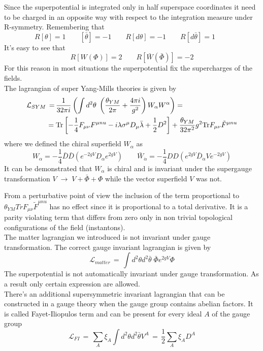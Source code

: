 \begin{appendices}
Since the superpotential is integrated only in half superspace coordinates it need to be charged in an opposite way with respect to the integration measure under R-symmetry.
Remembering  that
\begin{equation}
R[\theta] = 1 \qquad [\bar{\theta}] = - 1 \qquad R[d\theta] = -1 \qquad R [d \bar{\theta}] = 1 \qquad
\end{equation}
It's easy to see that 
\begin{equation}
R[W(\Phi)] = 2 \qquad R[\bar{W}(\bar{\Phi})] = -2
\end{equation}
For this reason in most situations the superpotential fix the supercharges of the fields.
\\
The lagrangian of super Yang-Mills theories is given by
\begin{align}
\mathcal{L}_{SYM} \, = \, & \frac{1}{32 \pi i  } \left( \int d^2 \theta \; \left( \frac{\theta_{YM}}{2 \pi}   + \frac{4 \pi i}{g^2} \right) W_{\alpha} W^{\alpha} \right) 
= 
\\
= \; & \hbox{Tr} \left[ -\frac{1}{4} F_{ \mu \nu} F^{\mu nu } - i \lambda \sigma^{\mu} D_{\mu} \bar{\lambda}  + \frac{1}{2} D^2 \right] + \frac{\theta_{YM}}{32 \pi^2 }g^2 \hbox{Tr} F_{ \mu \nu} \tilde{F}^{\mu nu } 
\end{align}
where we defined the chiral superfield $W_{\alpha}$ as
\begin{equation}
 W_{\alpha} = - \frac{1}{4} \bar{D} \bar{D}\left(e^{-2 g V}  D_{\alpha}  e^{2g V} \right) \qquad  
\bar{W}_{\dot{\alpha}} = - \frac{1}{4} D D \left(   e^{2gV} \bar{D}_{\dot{\alpha}} V e^{-2gV} \right)  
\end{equation}
It can be demonstrated that $W_{\alpha}$ is chiral and is invariant under the supergauge transformation $V \; \rightarrow \; V + \bar{\Phi} + \Phi$ while the vector superfield $V$ was not.

From a perturbative point of view the inclusion of the term proportional to $\theta_{YM} {Tr} F_{ \mu \nu} \tilde{F}^{\mu nu }  $ has no effect since it is proportional to a total derivative. 
It is a parity violating term that differs from zero only in non trivial topological configurations of the field (instantons).
\\
The matter lagrangian we introduced is not invariant under gauge transformation.
The correct gauge invariant lagrangian is given by
\begin{equation}
 \mathcal{L}_{matter} \, = \, \int d^2 \theta d^2 \bar{\theta} \; \bar{\Phi} e^{ 2 g V} \Phi 
\end{equation}
The superpotential is not automatically invariant under gauge transformation. As a result only certain expression are allowed.
\\
There's an additional supersymmetric invariant lagrangian that can be constructed in a gauge theory when the gauge group contains abelian factors. 
It is called Fayet-Iliopulos term and can be present for every ideal $A$ of the gauge group
\begin{equation}
 \mathcal{L}_{FI} \, = \, \sum_{A} \xi_A \int d^2 \theta d^2 \bar{\theta} V^{A} \, = \, \frac{1}{2} \sum_{A} \xi_A D^A
 \end{equation}




\end{appendices}